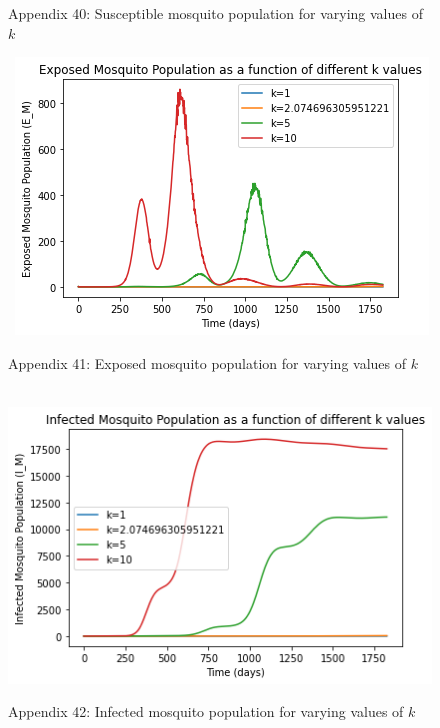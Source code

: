 \documentclass[
	12pt,				%
	oneside,			%
	a4paper,			%
	english,			%
	brazil				%
	]{abntex2}
\begin{document}
\begin{apendicesenv}
\begin{figure}[!ht]
	\caption*{Appendix 40: Susceptible mosquito population for varying values of $k$}
\end{figure} 
\begin{figure}[!ht]
	\centering
	\hbox{\hspace{7.0em} \includegraphics[scale=0.65] {THESIS-EM_for_k_values.png}}
	\caption*{Appendix 41: Exposed mosquito population for varying values of $k$}
\end{figure}
\begin{figure}[!ht]
	\centering
	\hbox{\hspace{7.0em} \includegraphics[scale=0.65] {THESIS-IM_for_k_values.png}}
	\caption*{Appendix 42: Infected mosquito population for varying values of $k$}
\end{figure}
\newpage






\end{apendicesenv}




\printindex
\end{document}
